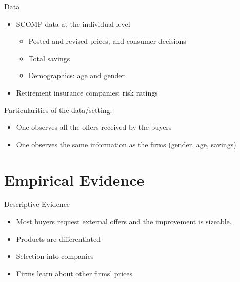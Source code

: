 \documentclass[10pt,aspectratio=169]{beamer}
\begin{document}

\begin{frame}{Data} \label{slide:data}
\begin{itemize}
    \item SCOMP data at the individual level  
    \begin{itemize}
        \item Posted and revised prices, and consumer decisions 
        \item Total savings 
        \item Demographics: age and gender \hyperlink{slide:fig_offer_certificate}{}
    \end{itemize}
     \item Retirement insurance companies: risk ratings
\end{itemize}

Particularities of the data/setting: 

\begin{itemize}
    \item One observes all the offers received by the buyers 
    \item One observes the same information as the firms (gender, age, savings)
\end{itemize}
\end{frame}


\section{Empirical Evidence}
 

\begin{frame}{Descriptive Evidence}\label{slide:Descriptive_evidence}
\begin{itemize}
    \item Most buyers request external offers and the improvement is sizeable. \hyperlink{slide:fig1}{} 
    \item Products are differentiated \hyperlink{slide:fig2}{} 
    \item Selection into companies \hyperlink{slide:fig3}{}
    \item Firms learn about other firms' prices  \hyperlink{slide:fig4}{} 
\end{itemize}
\end{frame}
\end{document}
